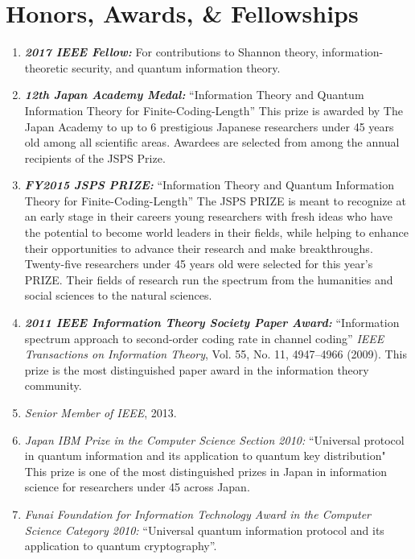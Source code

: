 
\section{Honors, Awards, \& Fellowships}
\begin{enumerate}
\item \textbf{\textit{2017 IEEE Fellow:}}  
For contributions to Shannon theory, information-theoretic security, and quantum information theory.
 


\item \textbf{\textit{12th Japan Academy Medal:}}  
``Information Theory and Quantum Information Theory for Finite-Coding-Length''
This prize is awarded by The Japan Academy to up to 6 prestigious Japanese researchers under 45 years old among all scientific areas.
Awardees are selected from among the annual recipients of the JSPS Prize.


\item \textbf{\textit{FY2015 JSPS PRIZE:}}  
``Information Theory and Quantum Information Theory for Finite-Coding-Length''
The JSPS PRIZE is meant to recognize at an early stage in their careers young researchers with fresh ideas who have the potential to become world leaders in their fields, while helping to enhance their opportunities to advance their research and make breakthroughs.
Twenty-five researchers under 45 years old were selected for this year's PRIZE. Their fields of research run the spectrum from the humanities and social sciences to the natural sciences.



\item \textbf{\textit{2011 IEEE Information Theory Society Paper Award:}} ``Information spectrum approach to second-order coding rate in channel coding''
{\em IEEE Transactions on Information Theory},
Vol. 55, No. 11, 4947--4966 (2009). 
This prize is the most distinguished paper award in the information theory community.

\item \textit{Senior Member of IEEE}, 2013. 

\item \textit{Japan IBM Prize in the Computer Science Section 2010:} ``Universal protocol in quantum information and its application to quantum key distribution"
This prize is one of the most distinguished prizes in Japan in information science for researchers under 45 across Japan.

\item \textit{Funai Foundation for Information Technology Award in the Computer Science Category 2010:} 
``Universal quantum information protocol and its application to quantum cryptography''.


\end{enumerate}
